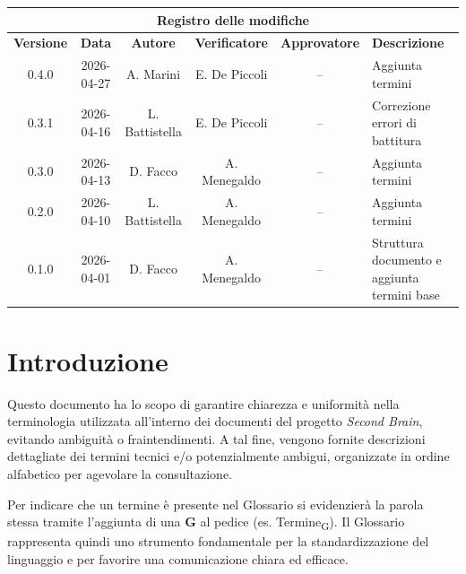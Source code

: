 \documentclass[a4paper, 10pt, colorlinks=true, linkcolor=black, urlcolor=blue, citecolor=blue, hidelinks]{article}
\begin{document}
\newcommand{\tipoverbale}{Glossario}
\newcommand{\dataversione}{2026-04-27}
\newcommand{\versione}{0.4.0}
\newcommand{\stato}{Stesura}
\newcommand{\destinatari}{Prof. Tullio Vardanega, prof. Riccardo Cardin, The Bitless}


\newpage

\begin{center}
    \begin{tabularx}{\textwidth}{|c|c|c|c|c|>{\raggedright\arraybackslash}X|}
        \hline
        \multicolumn{6}{|c|}{\textbf{Registro delle modifiche}} \\
        \hline
        \textbf{Versione} & \textbf{Data} & \textbf{Autore} & \textbf{Verificatore} & \textbf{Approvatore} & \textbf{Descrizione} \\
        \hline
        0.4.0 & 2026-04-27 &  A. Marini & E. De Piccoli & -- & Aggiunta termini \\
        \hline
        0.3.1 & 2026-04-16 & L. Battistella & E. De Piccoli & -- & Correzione errori di battitura \\
        \hline
        0.3.0 & 2026-04-13 & D. Facco & A. Menegaldo & -- & Aggiunta termini \\
        \hline
        0.2.0 & 2026-04-10 & L. Battistella & A. Menegaldo & -- & Aggiunta termini \\
        \hline
        0.1.0 & 2026-04-01 & D. Facco & A. Menegaldo & -- & Struttura documento e aggiunta termini base \\
        \hline
    \end{tabularx}
\end{center}

\newpage

\tableofcontents
\newpage


\section{Introduzione}
Questo documento ha lo scopo di garantire chiarezza e uniformità nella terminologia utilizzata all'interno dei documenti del progetto \textit{Second Brain}, evitando ambiguità o fraintendimenti. A tal fine, vengono fornite descrizioni dettagliate dei termini tecnici e/o potenzialmente ambigui, organizzate in ordine alfabetico per agevolare la consultazione.

Per indicare che un termine è presente nel Glossario si evidenzierà la parola stessa tramite l'aggiunta di una \textbf{G} al pedice (es. Termine\textsubscript{G}). Il Glossario rappresenta quindi uno strumento fondamentale per la standardizzazione del linguaggio e per favorire una comunicazione chiara ed efficace.
\end{document}
